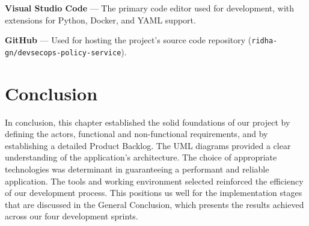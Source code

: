 \vspace{0.2cm}
\noindent\textbf{Visual Studio Code} \cite{vscode} — The primary code editor used for development, with extensions for Python, Docker, and YAML support.

\vspace{0.2cm}
\noindent\textbf{GitHub} \cite{github} — Used for hosting the project's source code repository (\texttt{ridha-gn/devsecops-policy-service}).

\section{Conclusion}

In conclusion, this chapter established the solid foundations of our project by defining the actors, functional and non-functional requirements, and by establishing a detailed Product Backlog. The UML diagrams provided a clear understanding of the application's architecture. The choice of appropriate technologies was determinant in guaranteeing a performant and reliable application. The tools and working environment selected reinforced the efficiency of our development process. This positions us well for the implementation stages that are discussed in the General Conclusion, which presents the results achieved across our four development sprints.
